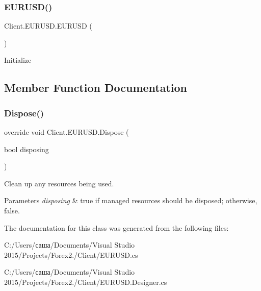 \subsubsection{\texorpdfstring{E\+U\+R\+U\+S\+D()}{EURUSD()}}
{\footnotesize\ttfamily Client.\+E\+U\+R\+U\+S\+D.\+E\+U\+R\+U\+SD (\begin{DoxyParamCaption}{ }\end{DoxyParamCaption})}



Initialize 



\subsection{Member Function Documentation}
\hypertarget{class_client_1_1_e_u_r_u_s_d_ac79778a2939989f2762ecbc06d90dbc6}{}\label{class_client_1_1_e_u_r_u_s_d_ac79778a2939989f2762ecbc06d90dbc6} 
\subsubsection{\texorpdfstring{Dispose()}{Dispose()}}
{\footnotesize\ttfamily override void Client.\+E\+U\+R\+U\+S\+D.\+Dispose (\begin{DoxyParamCaption}\item[{bool}]{disposing }\end{DoxyParamCaption})\hspace{0.3cm}{\ttfamily [protected]}}



Clean up any resources being used. 


\begin{DoxyParams}{Parameters}
{\em disposing} & true if managed resources should be disposed; otherwise, false.\\
\hline
\end{DoxyParams}


The documentation for this class was generated from the following files\+:\begin{DoxyCompactItemize}
\item 
C\+:/\+Users/саша/\+Documents/\+Visual Studio 2015/\+Projects/\+Forex2./\+Client/E\+U\+R\+U\+S\+D.\+cs\item 
C\+:/\+Users/саша/\+Documents/\+Visual Studio 2015/\+Projects/\+Forex2./\+Client/E\+U\+R\+U\+S\+D.\+Designer.\+cs\end{DoxyCompactItemize}
